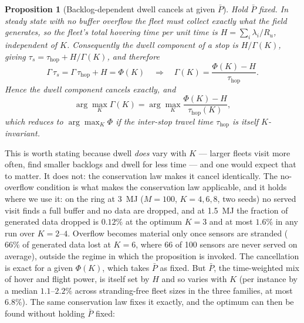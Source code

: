 \documentclass[journal,outdir=./]{IEEEtran}
\newtheorem{proposition}{Proposition}
\newcommand{\Pbar}{\bar{P}}
\newcommand{\Gam}{\Gamma}
\newcommand{\Ru}{R_u}
\begin{document}
\begin{proposition}[Backlog-dependent dwell cancels at given $\Pbar$]\label{prop:tau}
Hold $\Pbar$ fixed. In steady state with no buffer overflow the fleet must collect exactly what the field generates, so the fleet's total hovering time per unit time is $H=\sum_i\lambda_i/\Ru$, \emph{independent of $K$}. Consequently the dwell component of a stop is $H/\Gam(K)$, giving $\tau_s=\tau_{\mathrm{hop}}+H/\Gam(K)$, and therefore
\[
\Gam\,\tau_s=\Gam\,\tau_{\mathrm{hop}}+H=\Phi(K)\quad\Longrightarrow\quad \Gam(K)=\frac{\Phi(K)-H}{\tau_{\mathrm{hop}}} .
\]
Hence the \emph{dwell} component cancels exactly, and
\[
\arg\max_K\Gam(K)=\arg\max_K\frac{\Phi(K)-H}{\tau_{\mathrm{hop}}(K)},
\]
which reduces to $\arg\max_K\Phi$ if the inter-stop travel time $\tau_{\mathrm{hop}}$ is itself $K$-invariant.
\end{proposition}
This is worth stating because dwell \emph{does} vary with $K$ --- larger fleets visit more often, find smaller backlogs and dwell for less time --- and one would expect that to matter. It does not: the conservation law makes it cancel identically. The no-overflow condition is what makes the conservation law applicable, and it holds where we use it: on the ring at 3~MJ ($M=100$, $K=4,6,8$, two seeds) no served visit finds a full buffer and no data are dropped, and at 1.5~MJ the fraction of generated data dropped is $0.12\%$ at the optimum $K=3$ and at most $1.6\%$ in any run over $K=2$--$4$. Overflow becomes material only once sensors are stranded ($66\%$ of generated data lost at $K=6$, where 66 of 100 sensors are never served on average), outside the regime in which the proposition is invoked. The cancellation is exact for a given $\Phi(K)$, which takes $\Pbar$ as fixed. But $\Pbar$, the time-weighted mix of hover and flight power, is itself set by $H$ and so varies with $K$ (per instance by a median $1.1$--$2.2\%$ across stranding-free fleet sizes in the three families, at most $6.8\%$). The same conservation law fixes it exactly, and the optimum can then be found without holding $\Pbar$ fixed:
\end{document}
